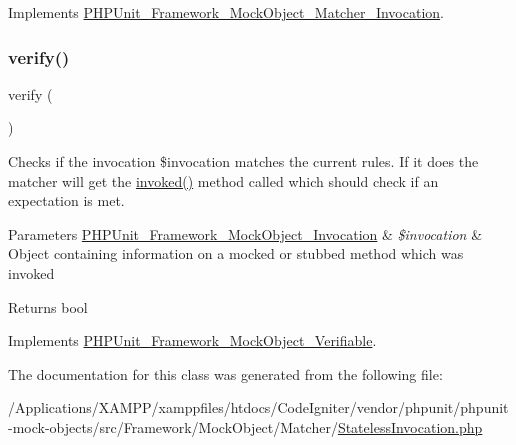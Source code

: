 Implements \mbox{\hyperlink{interface_p_h_p_unit___framework___mock_object___matcher___invocation_a63f37b06181c9547bc3c225007c34425}{P\+H\+P\+Unit\+\_\+\+Framework\+\_\+\+Mock\+Object\+\_\+\+Matcher\+\_\+\+Invocation}}.

\mbox{\label{class_p_h_p_unit___framework___mock_object___matcher___stateless_invocation_aa33600b6a1b28d0c4dfe4d468272aaa4}} 
\subsubsection{\texorpdfstring{verify()}{verify()}}
{\footnotesize\ttfamily verify (\begin{DoxyParamCaption}{ }\end{DoxyParamCaption})}

Checks if the invocation \$invocation matches the current rules. If it does the matcher will get the \mbox{\hyperlink{class_p_h_p_unit___framework___mock_object___matcher___stateless_invocation_a63f37b06181c9547bc3c225007c34425}{invoked()}} method called which should check if an expectation is met.


\begin{DoxyParams}[1]{Parameters}
\mbox{\hyperlink{interface_p_h_p_unit___framework___mock_object___invocation}{P\+H\+P\+Unit\+\_\+\+Framework\+\_\+\+Mock\+Object\+\_\+\+Invocation}} & {\em \$invocation} & Object containing information on a mocked or stubbed method which was invoked\\
\hline
\end{DoxyParams}
\begin{DoxyReturn}{Returns}
bool 
\end{DoxyReturn}


Implements \mbox{\hyperlink{interface_p_h_p_unit___framework___mock_object___verifiable_aa33600b6a1b28d0c4dfe4d468272aaa4}{P\+H\+P\+Unit\+\_\+\+Framework\+\_\+\+Mock\+Object\+\_\+\+Verifiable}}.



The documentation for this class was generated from the following file\+:\begin{DoxyCompactItemize}
\item 
/\+Applications/\+X\+A\+M\+P\+P/xamppfiles/htdocs/\+Code\+Igniter/vendor/phpunit/phpunit-\/mock-\/objects/src/\+Framework/\+Mock\+Object/\+Matcher/\mbox{\hyperlink{_stateless_invocation_8php}{Stateless\+Invocation.\+php}}\end{DoxyCompactItemize}
